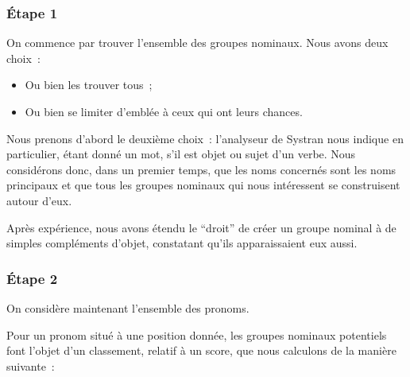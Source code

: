 \documentclass[a4paper, 12pt]{article}
\begin{document}
\subsubsection{Étape 1}
On commence par trouver l'ensemble des groupes nominaux. Nous avons deux choix~:
\begin{itemize}
 \item Ou bien les trouver tous~;
 \item Ou bien se limiter d'emblée à ceux qui ont leurs chances.
\end{itemize}

Nous prenons d'abord le deuxième choix~: l'analyseur de Systran nous indique en particulier, étant donné un mot, s'il est objet ou sujet d'un verbe. Nous considérons donc, dans un premier temps, que les noms concernés sont les noms principaux et que tous les groupes nominaux qui nous intéressent se construisent autour d'eux.

Après expérience, nous avons étendu le ``droit'' de créer un groupe nominal à de simples compléments d'objet, constatant qu'ils apparaissaient eux aussi.


\subsubsection{Étape 2}
On considère maintenant l'ensemble des pronoms.

Pour un pronom situé à une position donnée, les groupes nominaux potentiels font l'objet d'un classement, relatif à un score, que nous calculons de la manière suivante~:
\end{document}

